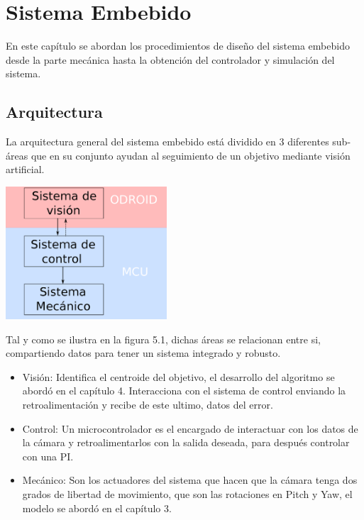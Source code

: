 \chapter{Sistema Embebido}

En este capítulo se abordan los procedimientos de diseño del sistema embebido desde la parte mecánica hasta la
obtención del controlador y simulación del sistema.

\section{Arquitectura}
La arquitectura general del sistema embebido está dividido en 3 diferentes sub-áreas que en su conjunto ayudan al
seguimiento de un objetivo mediante visión artificial.
\begin{center}
	\includegraphics[width=0.45\textwidth]{Contenido/Cuerpo/Capitulo5/Fig12.eps}
	\label{Fig1}
\end{center}
Tal y como se ilustra en la figura 5.1, dichas áreas se relacionan entre si, compartiendo datos para tener un
sistema integrado y robusto.
\begin{itemize}
    \item Visión: Identifica el centroide del objetivo, el desarrollo del algoritmo se abordó en el capítulo 4. Interacciona con el sistema de control enviando la retroalimentación
          y recibe de este ultimo, datos del error.
    \item Control: Un microcontrolador es el encargado de interactuar con los datos de la cámara y retroalimentarlos con la
          salida deseada, para después controlar con una PI.
    \item Mecánico: Son los actuadores del sistema que hacen que la cámara tenga dos grados de libertad de movimiento, que
          son las rotaciones en Pitch y Yaw, el modelo se abordó en el capítulo 3.
\end{itemize}
